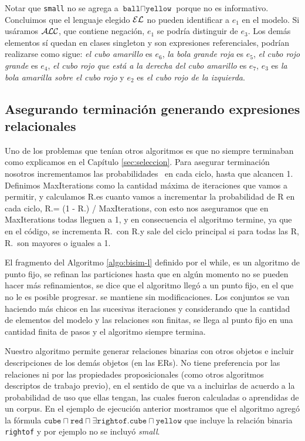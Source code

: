 Notar que \texttt{small} no se agrega a $\texttt{ball} \sqcap \texttt{yellow}$ porque no es informativo. Concluimos que el lenguaje elegido $\mathcal{EL}$ no pueden identificar a $e_1$ en el modelo. Si us\'aramos $\mathcal{ALC}$, que contiene negaci\'on, $e_1$ se podr\'ia distinguir de $e_3$. Los dem\'as elementos s\'i quedan en clases singleton y son expresiones referenciales, podr\'ian realizarse como sigue:
{\it el cubo amarillo} es $e_6$, {\it la bola grande roja} es $e_5$, {\it el cubo rojo grande} es $e_4$, {\it el cubo rojo que est\'a a la derecha del cubo amarillo} es $e_7$, $e_3$ es {\it la bola amarilla sobre el cubo rojo} y $e_2$ es {\it el cubo rojo de la izquierda}.
 
\subsection{Asegurando terminaci\'on generando expresiones relacionales}

Uno de los problemas que ten\'ian otros algoritmos es que no siempre terminaban como explicamos en el Cap\'itulo \ref{sec:seleccion}. Para asegurar terminaci\'on nosotros incrementamos las probabilidades \puse\ en cada ciclo, hasta que alcancen 1. Definimos MaxIterations como la cantidad m\'axima de iteraciones que vamos a permitir, y calculamos R.\incuse es cuanto vamos a incrementar la probabilidad de R en cada ciclo, R.\incuse = (1 - R.\puse) / MaxIterations, con esto nos aseguramos que en MaxIterations todas lleguen a 1, y en consecuencia el algoritmo termine, ya que en el c\'odigo, se incrementa R.\puse\ con R.\incuse y sale del ciclo principal si para todas las R, R.\puse\ son mayores o iguales a 1.

El fragmento del Algoritmo \ref{algo:bisim-l} definido por el while, es un algoritmo de punto fijo, se refinan las particiones hasta que en alg\'un momento no se pueden hacer m\'as refinamientos, se dice que el algoritmo lleg\'o a un punto fijo, en el que no le es posible progresar. \RE se mantiene sin modificaciones. Los conjuntos se van haciendo m\'as chicos en las sucesivas iteraciones y considerando que la cantidad de elementos del modelo y las relaciones son finitas, se llega al punto fijo en una cantidad finita de pasos y el algoritmo siempre termina.

Nuestro algoritmo permite generar relaciones binarias con otros objetos e incluir descripciones de los dem\'as objetos (en las ERs). No tiene preferencia por las relaciones ni por las propiedades proposicionales (como otros algoritmos descriptos de trabajo previo), en el sentido de que va a incluirlas de acuerdo a la probabilidad de uso que ellas tengan, las cuales fueron calculadas o aprendidas de un corpus. En el ejemplo de ejecuci\'on anterior mostramos que el algoritmo agreg\'o la f\'ormula $\texttt{cube} \sqcap \texttt{red} \sqcap \exists \texttt{rightof}. \texttt{cube} \sqcap \texttt{yellow}$ que incluye la relaci\'on binaria \texttt{rightof} y por ejemplo no se incluy\'o {\it small}.

